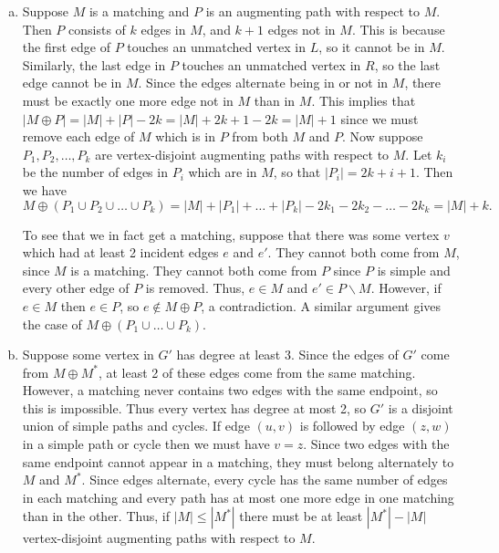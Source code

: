 \documentclass{article}
\begin{document}
\begin{enumerate}[a.]
\item Suppose $M$ is a matching and $P$ is an augmenting path with respect to $M$.  Then $P$ consists of $k$ edges in $M$, and $k+1$ edges not in $M$.  This is because the first edge of $P$ touches an unmatched vertex in $L$, so it cannot be in $M$.  Similarly, the last edge in $P$ touches an unmatched vertex in $R$, so the last edge cannot be in $M$.  Since the edges alternate being in or not in $M$, there must be exactly one more edge not in $M$ than in $M$.   This implies that $|M \oplus P| = |M| + |P| - 2k = |M| + 2k + 1 - 2k = |M| + 1$ since we must remove each edge of $M$ which is in $P$ from both $M$ and $P$.  Now suppose $P_1, P_2, \ldots, P_k$ are vertex-disjoint augmenting paths with respect to $M$.  Let $k_i$ be the number of edges in $P_i$ which are in $M$, so that $|P_i| = 2k+i + 1$.  Then we have 
\[ M \oplus (P_1 \cup P_2 \cup \ldots \cup P_k) = |M| + |P_1| + \ldots + |P_k| - 2k_1 - 2k_2 - \ldots - 2k_k = |M| + k.\]

To see that we in fact get a matching, suppose that there was some vertex $v$ which had at least 2 incident edges $e$ and $e'$.  They cannot both come from $M$, since $M$ is a matching. They cannot both come from $P$ since $P$ is simple and every other edge of $P$ is removed.  Thus, $e \in M$ and $e' \in P\backslash M$.  However, if $e \in M$ then $e \in P$, so $e \notin M \oplus P$, a contradiction.  A similar argument gives the case of $M \oplus (P_1 \cup \ldots \cup P_k)$. %


\item Suppose some vertex in $G'$ has degree at least 3.  Since the edges of $G'$ come from $M \oplus M^*$, at least 2 of these edges come from the same matching.  However, a matching never contains two edges with the same endpoint, so this is impossible.  Thus every vertex has degree at most 2, so $G'$ is a disjoint union of simple paths and cycles. If edge $(u,v)$ is followed by edge $(z,w)$ in a simple path or cycle then we must have $v = z$.  Since two edges with the same endpoint cannot appear in a matching, they must belong alternately to $M$ and $M^*$.  Since edges alternate, every cycle has the same number of edges in each matching and every path has at most one more edge in one matching than in the other.  Thus, if $|M| \leq |M^*|$ there must be at least $|M^*| - |M|$ vertex-disjoint augmenting paths with respect to $M$. 


\end{enumerate}
\end{document}
